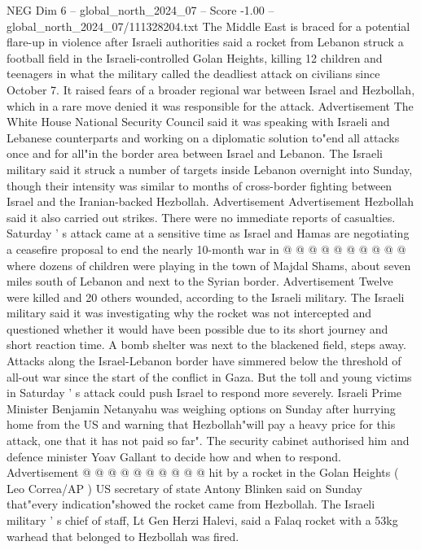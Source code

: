 \begin{textsample}{NEG Dim 6 – global\_north\_2024\_07 – Score -1.00 – global\_north\_2024\_07/111328204.txt}  \label{ex:f6_neg_140}
The Middle East is braced for a potential flare-up in violence after Israeli authorities said a rocket from Lebanon struck a football field in the Israeli-controlled Golan Heights, killing 12 children and teenagers in what the military called the deadliest attack on civilians since October 7.
It raised fears of a broader regional war between Israel and Hezbollah, which in a rare move denied it was responsible for the attack.
Advertisement The White House National Security Council said it was speaking with Israeli and Lebanese counterparts and working on a diplomatic solution to"end all attacks once and for all"in the border area between Israel and Lebanon.
The Israeli military said it struck a number of targets inside Lebanon overnight into Sunday, though their intensity was similar to months of cross-border fighting between Israel and the Iranian-backed Hezbollah.
Advertisement Advertisement Hezbollah said it also carried out strikes.
There were no immediate reports of casualties.
Saturday ' s attack came at a sensitive time as Israel and Hamas are negotiating a ceasefire proposal to end the nearly 10-month war in @ @ @ @ @ @ @ @ @ @ where dozens of children were playing in the town of Majdal Shams, about seven miles south of Lebanon and next to the Syrian border.
Advertisement Twelve were killed and 20 others wounded, according to the Israeli military.
The Israeli military said it was investigating why the rocket was not intercepted and questioned whether it would have been possible due to its short journey and short reaction time.
A bomb shelter was next to the blackened field, steps away.
Attacks along the Israel-Lebanon border have simmered below the threshold of all-out war since the start of the conflict in Gaza.
But the toll and young victims in Saturday ' s attack could push Israel to respond more severely.
Israeli Prime Minister Benjamin Netanyahu was weighing options on Sunday after hurrying home from the US and warning that Hezbollah"will pay a heavy price for this attack, one that it has not paid so far".
The security cabinet authorised him and defence minister Yoav Gallant to decide how and when to respond.
Advertisement @ @ @ @ @ @ @ @ @ @ hit by a rocket in the Golan Heights ( Leo Correa/AP ) US secretary of state Antony Blinken said on Sunday that"every indication"showed the rocket came from Hezbollah.
The Israeli military ' s chief of staff, Lt Gen Herzi Halevi, said a Falaq rocket with a 53kg warhead that belonged to Hezbollah was fired.

\end{textsample}
